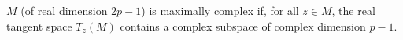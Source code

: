 
$M$ (of real dimension $2p - 1$) is maximally complex if, for all $z \in M$, the real tangent space $T_z(M)$ contains a complex subspace of complex dimension $p - 1$.
